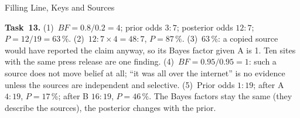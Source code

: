 \begin{uebungsblattc}{Filling Line, Keys and Sources}
\begin{lehrhinweis}
\textbf{Task~13.} (1)~$\mathit{BF}=0.8/0.2=4$; prior odds $3:7$;
posterior odds $12:7$; $P=12/19=63\,\%$. (2)~$12:7\times4=48:7$,
$P=87\,\%$. (3)~63\,\%: a copied source would have reported the claim
anyway, so its Bayes factor given A is 1. Ten sites with the same press
release are one finding. (4)~$\mathit{BF}=0.95/0.95=1$: such a source
does not move belief at all; \enquote{it was all over the internet} is
no evidence unless the sources are independent and selective. (5)~Prior
odds $1:19$; after A $4:19$, $P=17\,\%$; after B $16:19$, $P=46\,\%$.
The Bayes factors stay the same (they describe the sources), the
posterior changes with the prior.
\end{lehrhinweis}
\end{uebungsblattc}
